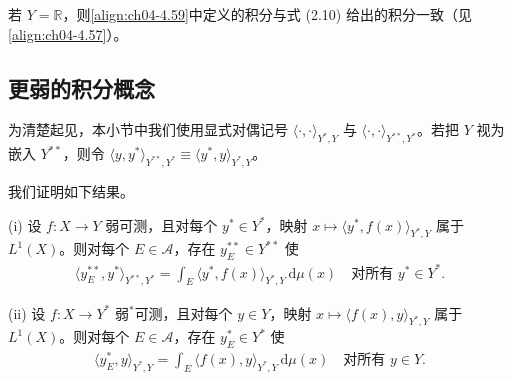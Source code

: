 \documentclass[../../main.tex]{subfiles}%
\begin{document}
\begin{remark}\label{remark:ch04-向量测度积分一致}
若 $Y=\mathbb{R}$，则\eqref{align:ch04-4.59}中定义的积分与式 (2.10) 给出的积分一致（见\eqref{align:ch04-4.57}）。
\end{remark}

\subsection{更弱的积分概念}\label{subsection:ch04-弱积分}

为清楚起见，本小节中我们使用显式对偶记号 $\langle\cdot,\cdot\rangle_{Y^*,Y}$ 与 $\langle\cdot,\cdot\rangle_{Y^{**},Y^*}$。若把 $Y$ 视为嵌入 $Y^{**}$，则令 $\langle y,y^*\rangle_{Y^{**},Y^*}\equiv\langle y^*,y\rangle_{Y^*,Y}$。

我们证明如下结果。

\begin{proposition}\label{proposition:ch04-Pettis积分存在}
(i) 设 $f:X\to Y$ 弱可测，且对每个 $y^*\in Y^*$，映射 $x\mapsto\langle y^*,f(x)\rangle_{Y^*,Y}$ 属于 $L^1(X)$。则对每个 $E\in\mathcal{A}$，存在 $y_E^{**}\in Y^{**}$ 使
\begin{align}
\langle y_E^{**},y^*\rangle_{Y^{**},Y^*}=\int_E\langle y^*,f(x)\rangle_{Y^*,Y}\,\mathrm{d}\mu(x)\quad\text{对所有 }y^*\in Y^*. \label{align:ch04-4.61}
\end{align}

(ii) 设 $f:X\to Y^*$ 弱$^*$可测，且对每个 $y\in Y$，映射 $x\mapsto\langle f(x),y\rangle_{Y^*,Y}$ 属于 $L^1(X)$。则对每个 $E\in\mathcal{A}$，存在 $y_E^*\in Y^*$ 使
\begin{align}
\langle y_E^*,y\rangle_{Y^*,Y}=\int_E\langle f(x),y\rangle_{Y^*,Y}\,\mathrm{d}\mu(x)\quad\text{对所有 }y\in Y. \label{align:ch04-4.62}
\end{align}
\end{proposition}
\end{document}
